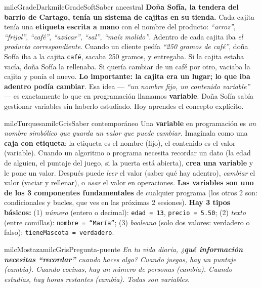 \documentclass[11pt,letterpaper]{article}
\begin{document}
\begin{softbox}{milcGradeDark}{milcGradeSoft}{Saber ancestral}
\textbf{Doña Sofía, la tendera del barrio de Cartago, tenía un sistema de cajitas en su tienda.} Cada cajita tenía una \textbf{etiqueta escrita a mano} con el nombre del producto: \emph{``arroz''}, \emph{``frijol''}, \emph{``café''}, \emph{``azúcar''}, \emph{``sal''}, \emph{``maíz molido''}. Adentro de cada cajita iba \emph{el producto correspondiente}. Cuando un cliente pedía \emph{``250 gramos de café''}, doña Sofía iba a la cajita \texttt{café}, sacaba 250 gramos, y entregaba. Si la cajita estaba vacía, doña Sofía la rellenaba. Si quería cambiar de un café por otro, vaciaba la cajita y ponía el nuevo. \textbf{Lo importante: la cajita era un lugar; lo que iba adentro podía cambiar}. Esa idea --- \emph{``un nombre fijo, un contenido variable''} --- es exactamente lo que en programación llamamos \textbf{variable}. Doña Sofía sabía gestionar variables sin haberlo estudiado. Hoy aprendes el concepto explícito.
\end{softbox}

\begin{softbox}{milcTurquesa}{milcGris}{Saber contemporáneo}
Una \textbf{variable} en programación es \emph{un nombre simbólico que guarda un valor que puede cambiar}. Imagínala como una \textbf{caja con etiqueta}: la etiqueta es el nombre (fijo), el contenido es el valor (variable). Cuando un algoritmo o programa necesita recordar un dato (la edad de alguien, el puntaje del juego, si la puerta está abierta), \textbf{crea una variable} y le pone un valor. Después puede \emph{leer} el valor (saber qué hay adentro), \emph{cambiar} el valor (vaciar y rellenar), o \emph{usar} el valor en operaciones. \textbf{Las variables son uno de los 3 componentes fundamentales} de cualquier programa (los otros 2 son: condicionales y bucles, que ves en las próximas 2 sesiones). \textbf{Hay 3 tipos básicos:} (1) \emph{número} (entero o decimal): \texttt{edad = 13}, \texttt{precio = 5.50}; (2) \emph{texto} (entre comillas): \texttt{nombre = ``María''}; (3) \emph{booleano} (solo dos valores: verdadero o falso): \texttt{tieneMascota = verdadero}.
\end{softbox}

\begin{softbox}{milcMostaza}{milcGris}{Pregunta-puente}
\textit{En tu vida diaria, ¿\textbf{qué información necesitas ``recordar''} cuando haces algo? Cuando juegas, hay un \emph{puntaje} (cambia). Cuando cocinas, hay un \emph{número de personas} (cambia). Cuando estudias, hay \emph{horas restantes} (cambia). Todas son variables.}
\end{softbox}
\end{document}
